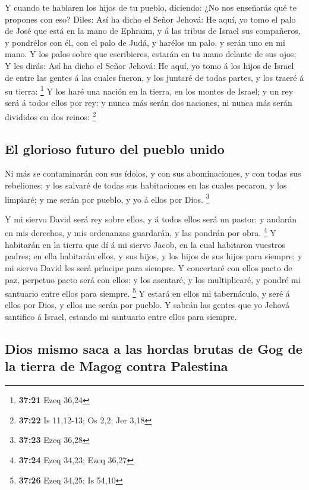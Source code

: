  Y cuando te hablaren los hijos de tu pueblo, diciendo: ¿No
nos enseñarás qué te propones con eso?  Diles: Así ha dicho
el Señor Jehová: He aquí, yo tomo el palo de José que está en la mano de
Ephraim, y á las tribus de Israel sus compañeros, y pondrélos con él,
con el palo de Judá, y harélos un palo, y serán uno en mi mano.
 Y los palos sobre que escribieres, estarán en tu mano
delante de sus ojos;  Y les dirás: Así ha dicho el Señor
Jehová: He aquí, yo tomo á los hijos de Israel de entre las gentes á las
cuales fueron, y los juntaré de todas partes, y los traeré á su tierra:
\footnote{\textbf{37:21} Ezeq 36,24}  Y los haré una nación
en la tierra, en los montes de Israel; y un rey será á todos ellos por
rey: y nunca más serán dos naciones, ni nunca más serán divididos en dos
reinos: \footnote{\textbf{37:22} Is 11,12-13; Os 2,2; Jer 3,18}

\hypertarget{el-glorioso-futuro-del-pueblo-unido}{%
\subsection{El glorioso futuro del pueblo
unido}\label{el-glorioso-futuro-del-pueblo-unido}}

 Ni más se contaminarán con sus ídolos, y con sus
abominaciones, y con todas sus rebeliones: y los salvaré de todas sus
habitaciones en las cuales pecaron, y los limpiaré; y me serán por
pueblo, y yo á ellos por Dios. \footnote{\textbf{37:23} Ezeq 36,28}

 Y mi siervo David será rey sobre ellos, y á todos ellos
será un pastor: y andarán en mis derechos, y mis ordenanzas guardarán, y
las pondrán por obra. \footnote{\textbf{37:24} Ezeq 34,23; Ezeq 36,27}
 Y habitarán en la tierra que dí á mi siervo Jacob, en la
cual habitaron vuestros padres; en ella habitarán ellos, y sus hijos, y
los hijos de sus hijos para siempre; y mi siervo David les será príncipe
para siempre.  Y concertaré con ellos pacto de paz,
perpetuo pacto será con ellos: y los asentaré, y los multiplicaré, y
pondré mi santuario entre ellos para siempre. \footnote{\textbf{37:26}
  Ezeq 34,25; Is 54,10}  Y estará en ellos mi tabernáculo,
y seré á ellos por Dios, y ellos me serán por pueblo.  Y
sabrán las gentes que yo Jehová santifico á Israel, estando mi santuario
entre ellos para siempre.

\hypertarget{dios-mismo-saca-a-las-hordas-brutas-de-gog-de-la-tierra-de-magog-contra-palestina}{%
\subsection{Dios mismo saca a las hordas brutas de Gog de la tierra de
Magog contra
Palestina}\label{dios-mismo-saca-a-las-hordas-brutas-de-gog-de-la-tierra-de-magog-contra-palestina}}

